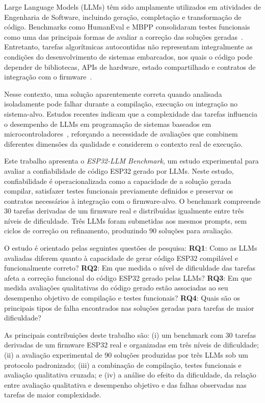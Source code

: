 \documentclass[12pt]{article}
\begin{document}
Large Language Models (LLMs) têm sido amplamente utilizados em atividades de Engenharia de Software, incluindo geração, completação e transformação de código. Benchmarks como HumanEval e MBPP consolidaram testes funcionais como uma das principais formas de avaliar a correção das soluções geradas~\cite{chen2021codex,austin2021program}. Entretanto, tarefas algorítmicas autocontidas não representam integralmente as condições do desenvolvimento de sistemas embarcados, nos quais o código pode depender de bibliotecas, APIs de hardware, estado compartilhado e contratos de integração com o firmware~\cite{englhardt2023embedded}.

Nesse contexto, uma solução aparentemente correta quando analisada isoladamente pode falhar durante a compilação, execução ou integração no sistema-alvo. Estudos recentes indicam que a complexidade das tarefas influencia o desempenho de LLMs em programação de sistemas baseados em microcontroladores~\cite{babiuch2026benchmarking}, reforçando a necessidade de avaliações que combinem diferentes dimensões da qualidade e considerem o contexto real de execução.

Este trabalho apresenta o \textit{ESP32-LLM Benchmark}, um estudo experimental para avaliar a confiabilidade de código ESP32 gerado por LLMs. Neste estudo, confiabilidade é operacionalizada como a capacidade de a solução gerada compilar, satisfazer testes funcionais previamente definidos e preservar os contratos necessários à integração com o firmware-alvo. O benchmark compreende 30 tarefas derivadas de um firmware real e distribuídas igualmente entre três níveis de dificuldade. Três LLMs foram submetidas aos mesmos prompts, sem ciclos de correção ou refinamento, produzindo 90 soluções para avaliação.

O estudo é orientado pelas seguintes questões de pesquisa: \textbf{RQ1}: Como as LLMs avaliadas diferem quanto à capacidade de gerar código ESP32 compilável e funcionalmente correto? \textbf{RQ2}: Em que medida o nível de dificuldade das tarefas afeta a correção funcional do código ESP32 gerado pelas LLMs? \textbf{RQ3}: Em que medida avaliações qualitativas do código gerado estão associadas ao seu desempenho objetivo de compilação e testes funcionais? \textbf{RQ4}: Quais são os principais tipos de falha encontrados nas soluções geradas para tarefas de maior dificuldade?

As principais contribuições deste trabalho são: (i) um benchmark com 30 tarefas derivadas de um firmware ESP32 real e organizadas em três níveis de dificuldade; (ii) a avaliação experimental de 90 soluções produzidas por três LLMs sob um protocolo padronizado; (iii) a combinação de compilação, testes funcionais e avaliação qualitativa cruzada; e (iv) a análise do efeito da dificuldade, da relação entre avaliação qualitativa e desempenho objetivo e das falhas observadas nas tarefas de maior complexidade.
\end{document}
